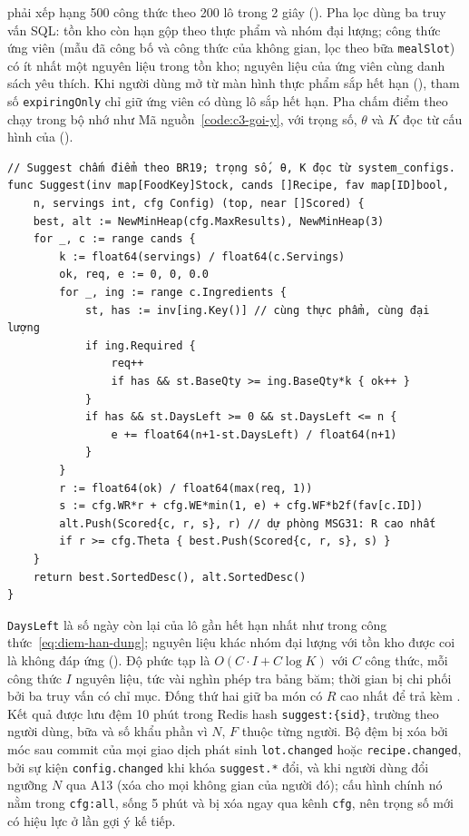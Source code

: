  phải xếp hạng 500 công thức theo 200 lô trong 2 giây (). Pha lọc dùng ba truy vấn SQL: tồn kho còn hạn gộp theo thực phẩm và nhóm đại lượng; công thức ứng viên (mẫu đã công bố và công thức của không gian, lọc theo bữa \texttt{mealSlot}) có ít nhất một nguyên liệu trong tồn kho; nguyên liệu của ứng viên cùng danh sách yêu thích. Khi người dùng mở từ màn hình thực phẩm sắp hết hạn (), tham số \texttt{expiringOnly} chỉ giữ ứng viên có dùng lô sắp hết hạn. Pha chấm điểm theo  chạy trong bộ nhớ như Mã nguồn~\ref{code:c3-goi-y}, với trọng số, $\theta$ và $K$ đọc từ cấu hình của  ().

\begin{Verbatim}
// Suggest chấm điểm theo BR19; trọng số, θ, K đọc từ system_configs.
func Suggest(inv map[FoodKey]Stock, cands []Recipe, fav map[ID]bool,
    n, servings int, cfg Config) (top, near []Scored) {
    best, alt := NewMinHeap(cfg.MaxResults), NewMinHeap(3)
    for _, c := range cands {
        k := float64(servings) / float64(c.Servings)
        ok, req, e := 0, 0, 0.0
        for _, ing := range c.Ingredients {
            st, has := inv[ing.Key()] // cùng thực phẩm, cùng đại lượng
            if ing.Required {
                req++
                if has && st.BaseQty >= ing.BaseQty*k { ok++ }
            }
            if has && st.DaysLeft >= 0 && st.DaysLeft <= n {
                e += float64(n+1-st.DaysLeft) / float64(n+1)
            }
        }
        r := float64(ok) / float64(max(req, 1))
        s := cfg.WR*r + cfg.WE*min(1, e) + cfg.WF*b2f(fav[c.ID])
        alt.Push(Scored{c, r, s}, r) // dự phòng MSG31: R cao nhất
        if r >= cfg.Theta { best.Push(Scored{c, r, s}, s) }
    }
    return best.SortedDesc(), alt.SortedDesc()
}
\end{Verbatim}

\texttt{DaysLeft} là số ngày còn lại của lô gần hết hạn nhất như trong công thức~\eqref{eq:diem-han-dung}; nguyên liệu khác nhóm đại lượng với tồn kho được coi là không đáp ứng (). Độ phức tạp là $O(C \cdot I + C \log K)$ với $C$ công thức, mỗi công thức $I$ nguyên liệu, tức vài nghìn phép tra bảng băm; thời gian bị chi phối bởi ba truy vấn có chỉ mục. Đống thứ hai giữ ba món có $R$ cao nhất để trả kèm . Kết quả được lưu đệm 10 phút trong Redis hash \texttt{suggest:\{sid\}}, trường theo người dùng, bữa và số khẩu phần vì $N$, $F$ thuộc từng người. Bộ đệm bị xóa bởi móc sau commit của mọi giao dịch phát sinh \texttt{lot.changed} hoặc \texttt{recipe.changed}, bởi sự kiện \texttt{config.changed} khi khóa \texttt{suggest.*} đổi, và khi người dùng đổi ngưỡng $N$ qua A13 (xóa cho mọi không gian của người đó); cấu hình chính nó nằm trong \texttt{cfg:all}, sống 5 phút và bị xóa ngay qua kênh \texttt{cfg}, nên trọng số mới có hiệu lực ở lần gợi ý kế tiếp.

